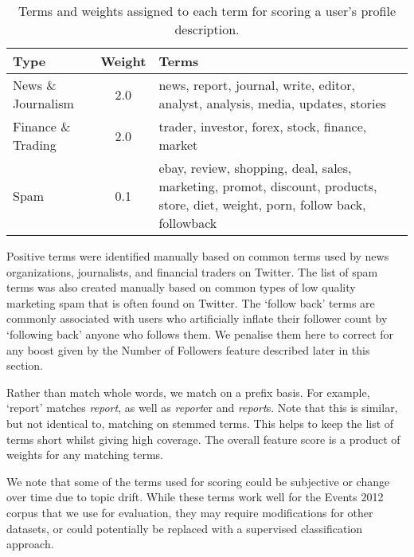 \begin{table}[h!]

	\caption{Terms and weights assigned to each term for scoring a user's profile description. }

	\begin{tabulary}{\textwidth}{l c L}
	\toprule
	\textbf{Type} &\textbf{Weight} & \textbf{Terms} \\
	\midrule

	News \& Journalism & 2.0 & news, report, journal, write, editor, analyst, analysis, media, updates, stories \\

	Finance \& Trading & 2.0 & trader, investor, forex, stock, finance, market \\

	Spam & 0.1 & ebay, review, shopping, deal, sales, marketing, promot, discount, products, store, diet, weight, porn, follow back, followback \\

	\bottomrule
	\end{tabulary}
	\label{scoring:table:authorKeywordsWeights}

\end{table}

Positive terms were identified manually based on common terms used by news organizations, journalists, and financial traders on Twitter. The list of spam terms was also created manually based on common types of low quality marketing spam that is often found on Twitter.
The `follow back' terms are commonly associated with users who artificially inflate their follower count by `following back' anyone who follows them.
We penalise them here to correct for any boost given by the Number of Followers feature described later in this section.

Rather than match whole words, we match on a prefix basis. For example, `report' matches \emph{report}, as well as \emph{report}er and \emph{report}s. Note that this is similar, but not identical to, matching on stemmed terms. This helps to keep the list of terms short whilst giving high coverage. The overall feature score is a product of weights for any matching terms.

We note that some of the terms used for scoring could be subjective or change over time due to topic drift.
While these terms work well for the Events 2012 corpus that we use for evaluation, they may require modifications for other datasets, or could potentially be replaced with a supervised classification approach.

